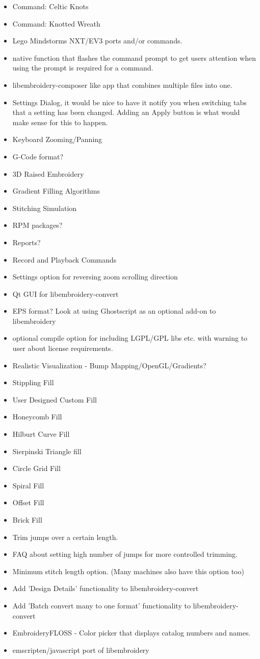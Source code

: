 \documentclass[a4paper]{report}
\begin{document}
\begin{itemize}
\item Command: Celtic Knots
\item Command: Knotted Wreath
\item Lego Mindstorms NXT/EV3 ports and/or commands.
\item native function that flashes the command prompt to get users attention when using the
prompt is required for a command.
\item libembroidery-composer like app that combines multiple files into one.
\item Settings Dialog, it would be nice to have it notify you when switching tabs that a
setting has been changed. Adding an Apply button is what would make sense for this to happen.
\item Keyboard Zooming/Panning
\item G-Code format?
\item 3D Raised Embroidery
\item Gradient Filling Algorithms
\item Stitching Simulation
\item RPM packages?
\item Reports?
\item Record and Playback Commands
\item Settings option for reversing zoom scrolling direction
\item Qt GUI for libembroidery-convert
\item EPS format? Look at using Ghostscript as an optional add-on to libembroidery
\item optional compile option for including LGPL/GPL libs etc. with warning to user about license requirements.
\item Realistic Visualization - Bump Mapping/OpenGL/Gradients?
\item Stippling Fill
\item User Designed Custom Fill
\item Honeycomb Fill
\item Hilburt Curve Fill
\item Sierpinski Triangle fill
\item Circle Grid Fill
\item Spiral Fill
\item Offset Fill
\item Brick Fill
\item Trim jumps over a certain length.
\item FAQ about setting high number of jumps for more controlled trimming.
\item Minimum stitch length option. (Many machines also have this option too)
\item Add 'Design Details' functionality to libembroidery-convert
\item Add 'Batch convert many to one format' functionality to libembroidery-convert
\item EmbroideryFLOSS - Color picker that displays catalog numbers and names.
\item emscripten/javascript port of libembroidery
\end{itemize}
\end{document}
